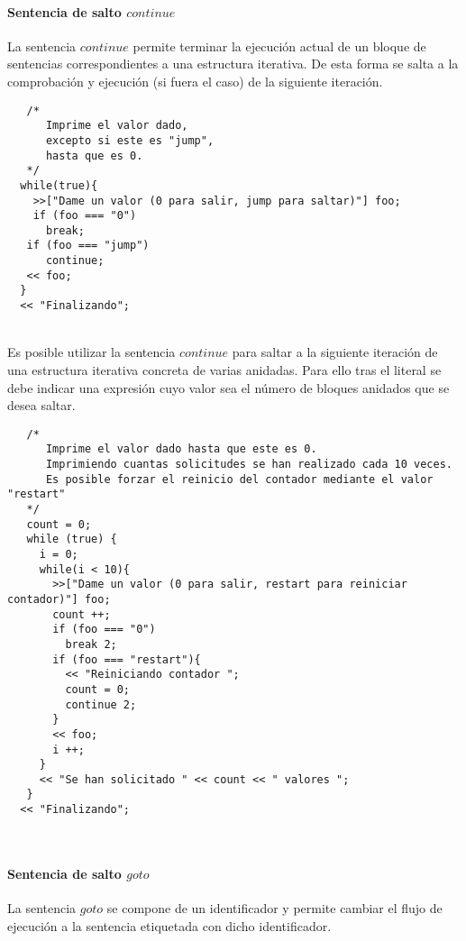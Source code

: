 \paragraph{Sentencia de salto $continue$} \label{sec:stmt_continue}

La sentencia $continue$ permite terminar la ejecución actual de un bloque de sentencias correspondientes a una estructura iterativa. De esta forma se salta a la comprobación y 
ejecución (si fuera el caso) de la siguiente iteración. \\

\begin{lstlisting}
   /*
      Imprime el valor dado,
      excepto si este es "jump",
      hasta que es 0.
   */
  while(true){
    >>["Dame un valor (0 para salir, jump para saltar)"] foo;
    if (foo === "0")
      break;
   if (foo === "jump")
      continue;
   << foo;
  }
  << "Finalizando";
\end{lstlisting}
\hfill\\

Es posible utilizar la sentencia $continue$ para saltar a la siguiente iteración de una estructura iterativa concreta de varias anidadas. Para ello tras el literal 
se debe indicar una expresión cuyo valor sea el número de bloques anidados que se desea saltar. \\

\begin{lstlisting}
   /*
      Imprime el valor dado hasta que este es 0.
      Imprimiendo cuantas solicitudes se han realizado cada 10 veces.
      Es posible forzar el reinicio del contador mediante el valor "restart"
   */
   count = 0;
   while (true) {
     i = 0;
     while(i < 10){
       >>["Dame un valor (0 para salir, restart para reiniciar contador)"] foo;
       count ++;
       if (foo === "0")
         break 2;
       if (foo === "restart"){
         << "Reiniciando contador ";
         count = 0;
         continue 2;
       }
       << foo;
       i ++;
     }
     << "Se han solicitado " << count << " valores ";
   }
  << "Finalizando";
\end{lstlisting} 
\hfill\\

\paragraph{Sentencia de salto $goto$} \label{sec:stmt_goto}
La sentencia $goto$ se compone de un identificador y  permite cambiar el flujo de ejecución a la sentencia etiquetada con dicho identificador. \\

